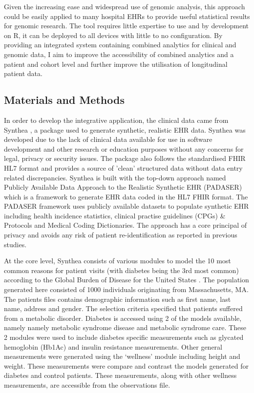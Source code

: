 \documentclass{bioinfo}
\begin{document}
Given the increasing ease and widespread use of genomic analysis, this approach could be easily applied to many hospital EHRs to provide useful statistical results for genomic research. The tool requires little expertise to use and by development on R, it can be deployed to all devices with little to no configuration. By providing an integrated system containing combined analytics for clinical and genomic data, I aim to improve the accessibility of combined analytics and a patient and cohort level and further improve the utilisation of longitudinal patient data. 


\begin{methods}
\section{Materials and Methods}
In order to develop the integrative application, the clinical data came from Synthea \citep{Synthea}, a package used to generate synthetic, realistic EHR data. Synthea was developed due to the lack of clinical data available for use in software development and other research or education purposes without any concerns for legal, privacy or security issues. The package also follows the standardised FHIR HL7 format and provides a source of 'clean' structured data without data entry related discrepancies. Synthea is built with the top-down approach named Publicly Available Data Approach to the Realistic Synthetic EHR (PADASER) which is a framework to generate EHR data coded in the HL7 FHIR format. The PADASER framework uses publicly available datasets to populate synthetic EHR including health incidence statistics, clinical practise guidelines (CPGs) & Protocols and Medical Coding Dictionaries. The approach has a core principal of privacy and avoids any risk of patient re-identification as reported \citep{ElEmam2011} in previous studies.  

At the core level, Synthea consists of various modules to model the 10 most common reasons for patient visits (with diabetes being the 3rd most common) according to the Global Burden of Disease for the United States \citep{Synthea}. The population generated here consisted of 1000 individuals originating from Massachusetts, MA. The patients files contains demographic information such as first name, last name, address and gender. The selection criteria specified that patients suffered from a metabolic disorder. Diabetes is accessed using 2 of the models available, namely namely metabolic syndrome disease and metabolic syndrome care. These 2 modules were used to include diabetes specific measurements such as glycated hemoglobin (Hb1Ac) and insulin resistance measurements. Other general measurements were generated using the `wellness' module including height and weight. These measurements were compare and contrast the models generated for diabetes and control patients. These measurements, along with other wellness measurements, are accessible from the observations file. 


\end{methods}
\end{document}
